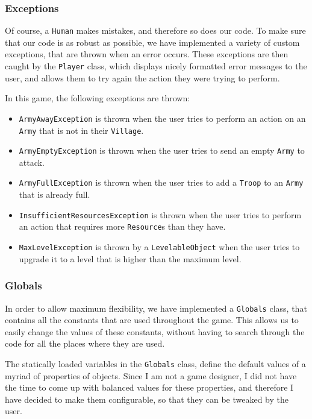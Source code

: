 \documentclass{article}
\newcommand{\code}[1]{\texttt{#1}}
\begin{document}
\subsubsection*{Exceptions}

Of course, a \code{Human} makes mistakes, and therefore so does our code. To make sure that 
our code is as robust as possible, we have implemented a variety of custom exceptions, that are thrown
when an error occurs. These exceptions are then caught by the \code{Player} class, which displays nicely 
formatted error messages to the user, and allows them to try again the action they were trying to perform.

In this game, the following exceptions are thrown:

    \begin{itemize}
        \item \code{ArmyAwayException} is thrown when the user tries to perform an action on an \code{Army} that is not in their \code{Village}.
        \item \code{ArmyEmptyException} is thrown when the user tries to send an empty \code{Army} to attack.
        \item \code{ArmyFullException} is thrown when the user tries to add a \code{Troop} to an \code{Army} that is already full.
        \item \code{InsufficientResourcesException} is thrown when the user tries to perform an action that requires more \code{Resource}s than they have.
        \item \code{MaxLevelException} is thrown by a \code{LevelableObject} when the user tries to upgrade it to a level that is higher than the maximum level.

    \end{itemize}

\subsubsection*{Globals}

In order to allow maximum flexibility, we have implemented a \code{Globals} class, that contains
all the constants that are used throughout the game. This allows us to easily change the values of
these constants, without having to search through the code for all the places where they are used.

The statically loaded variables in the \code{Globals} class, define the default values of a myriad of
properties of objects. Since I am not a game designer, I did not have the time to come up with balanced 
values for these properties, and therefore I have decided to make them configurable, so that they can be
tweaked by the user.
\end{document}
